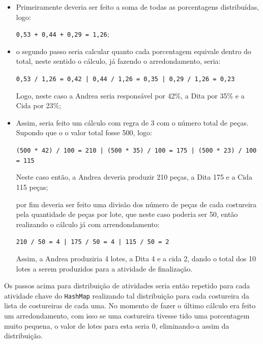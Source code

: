 \begin{itemize}
	\item Primeiramente deveria ser feito a soma de todas as porcentagens distribuídas, logo: 
	\par \texttt{0,53 + 0,44 + 0,29 = 1,26};
	
	\item o segundo passo seria calcular quanto cada porcentagem equivale dentro do total, neste 
	sentido o cálculo, já fazendo o arredondamento, seria: 
	\par \texttt{0,53 / 1,26 = 0,42 | 0,44 / 1,26 = 0,35 | 0,29 / 1,26 = 0,23}
	\par Logo, neste caso a Andrea seria responsável por 42\%, a Dita por 35\% e a Cida por 23\%;
	
	\item Assim, seria feito um cálculo com regra de 3 com o número total de peças. Supondo que o 
	o valor total fosse 500, logo:
	
	\par \texttt{(500 * 42) / 100 = 210 | (500 * 35) / 100 = 175 | (500 * 23) / 100 = 115}
	
	\par Neste caso então, a Andrea deveria produzir 210 peças, a Dita 175 e a Cida 115 peças;
	
	\par por fim deveria ser feito uma divisão dos número de peças de cada costureira pela quantidade
     de peças por lote, que neste caso poderia ser 50, então realizando o cálculo já com arrendondamento:
     \par \texttt{210 / 50 = 4 | 175 / 50 = 4 | 115 / 50 = 2}
     
     \par Assim, a Andrea produziria 4 lotes, a Dita 4 e a cida 2, dando o total dos 10 lotes a serem produzidos
     para a atividade de finalização.
	
\end{itemize}
 
 \par Os passos acima para distribuição de atividades seria então repetido para cada atividade chave do \texttt{HashMap}
 realizando tal distribuição para cada costureira da lista de costureiras de cada uma. No momento de fazer o último 
 cálculo era feito um arredondamento, com isso se uma costureira tivesse tido uma porcentagem muito pequena, o valor 
 de lotes para esta seria 0, eliminando-a assim da distribuição.
 
